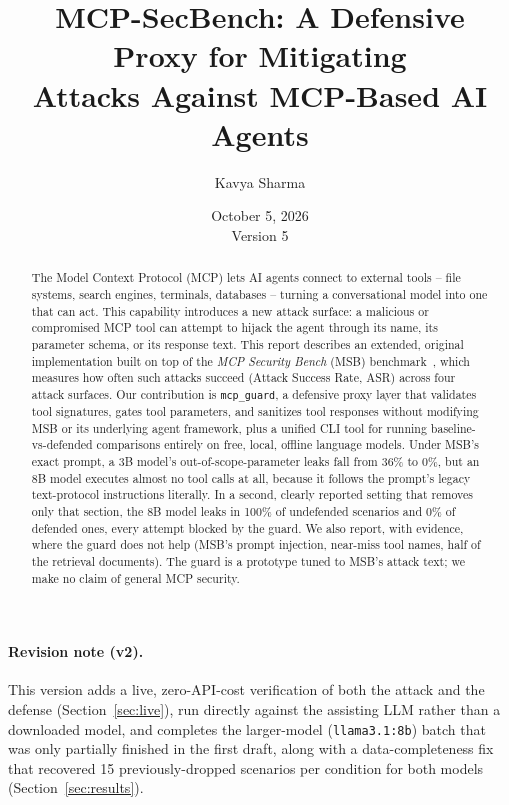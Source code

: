 \documentclass[11pt]{article}
\title{MCP-SecBench: A Defensive Proxy for Mitigating\\ Attacks Against MCP-Based AI Agents}
\author{Kavya Sharma}
\date{October 5, 2026 \\ \normalsize Version 5}
\begin{document}
\maketitle

\begin{abstract}
The Model Context Protocol (MCP) lets AI agents connect to external tools --
file systems, search engines, terminals, databases -- turning a
conversational model into one that can act. This capability introduces a new
attack surface: a malicious or compromised MCP tool can attempt to hijack the
agent through its name, its parameter schema, or its response text. This
report describes an extended, original implementation built on top of the
\emph{MCP Security Bench} (MSB) benchmark~\cite{msb2026}, which measures how
often such attacks succeed (Attack Success Rate, ASR) across four attack
surfaces. Our contribution is \texttt{mcp\_guard}, a defensive proxy layer
that validates tool signatures, gates tool parameters, and sanitizes tool
responses without modifying MSB or its underlying agent framework, plus a
unified CLI tool for running baseline-vs-defended comparisons entirely on
free, local, offline language models. Under MSB's exact prompt, a 3B model's
out-of-scope-parameter leaks fall from 36\% to 0\%, but an 8B model executes
almost no tool calls at all, because it follows the prompt's legacy
text-protocol instructions literally. In a second, clearly reported setting
that removes only that section, the 8B model leaks in 100\% of undefended
scenarios and 0\% of defended ones, every attempt blocked by the guard. We
also report, with evidence, where the guard does not help (MSB's prompt
injection, near-miss tool names, half of the retrieval documents). The guard
is a prototype tuned to MSB's attack text; we make no claim of general MCP
security.
\end{abstract}

\paragraph{Revision note (v2).} This version adds a live, zero-API-cost
verification of both the attack and the defense (Section~\ref{sec:live}),
run directly against the assisting LLM rather than a downloaded model, and
completes the larger-model (\texttt{llama3.1:8b}) batch that was only
partially finished in the first draft, along with a data-completeness fix
that recovered 15 previously-dropped scenarios per condition for both models
(Section~\ref{sec:results}).
\end{document}
